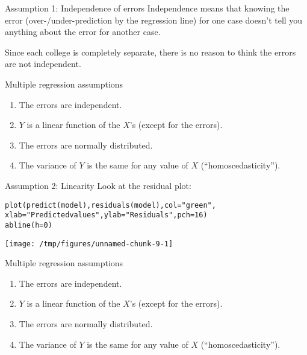 \documentclass{beamer}\usepackage[]{graphicx}\usepackage[]{color}
\makeatletter
\def\maxwidth{ %
  \ifdim\Gin@nat@width>\linewidth
    \linewidth
  \else
    \Gin@nat@width
  \fi
}
\newcommand{\hlnum}[1]{\textcolor[rgb]{0.824,0.412,0.118}{#1}}%
\newcommand{\hlstr}[1]{\textcolor[rgb]{1,0.894,0.71}{#1}}%
\newcommand{\hlstd}[1]{\textcolor[rgb]{1,0.894,0.769}{#1}}%
\newcommand{\hlkwc}[1]{\textcolor[rgb]{0.78,0.941,0.545}{#1}}%
\newcommand{\hlkwd}[1]{\textcolor[rgb]{1,0.78,0.769}{#1}}%
\newenvironment{kframe}{%
 \def\at@end@of@kframe{}%
 \ifinner\ifhmode%
  \def\at@end@of@kframe{\end{minipage}}%
  \begin{minipage}{\columnwidth}%
 \fi\fi%
 \def\FrameCommand##1{\hskip\@totalleftmargin \hskip-\fboxsep
 \colorbox{shadecolor}{##1}\hskip-\fboxsep
     \hskip-\linewidth \hskip-\@totalleftmargin \hskip\columnwidth}%
 \MakeFramed {\advance\hsize-\width
   \@totalleftmargin\z@ \linewidth\hsize
   \@setminipage}}%
 {\par\unskip\endMakeFramed%
 \at@end@of@kframe}
\newenvironment{knitrout}{}{} %
\makeatother
\begin{document}
\begin{darkframes}
    \begin{frame}{Assumption 1: Independence of errors}
      Independence means that knowing the error (over-/under-prediction by the regression line) for one case doesn't tell you anything about the error for another case.

      \bigskip\pause

      Since each college is completely separate, there is no reason to think the errors are not independent.
    \end{frame}

    \begin{frame}{Multiple regression assumptions}
      \begin{enumerate}
        \item The errors are independent. \greencheckmark
        \item $Y$ is a linear function of the $X$'s (except for the errors).
        \item The errors are normally distributed.
        \item The variance of $Y$ is the same for any value of $X$ (``homoscedasticity'').
      \end{enumerate}
    \end{frame}

    \begin{frame}[fragile]{Assumption 2: Linearity}
      Look at the residual plot:

\begin{knitrout}
\color{fgcolor}\begin{kframe}
\begin{alltt}
\hlkwd{plot}\hlstd{(}\hlkwd{predict}\hlstd{(model),} \hlkwd{residuals}\hlstd{(model),} \hlkwc{col}\hlstd{=}\hlstr{"green"}\hlstd{,}
  \hlkwc{xlab}\hlstd{=}\hlstr{"Predicted values"}\hlstd{,} \hlkwc{ylab}\hlstd{=}\hlstr{"Residuals"}\hlstd{,} \hlkwc{pch}\hlstd{=}\hlnum{16}\hlstd{)}
\hlkwd{abline}\hlstd{(}\hlkwc{h}\hlstd{=}\hlnum{0}\hlstd{)}
\end{alltt}
\end{kframe}
\texttt{[image: /tmp/figures/unnamed-chunk-9-1]} 

\end{knitrout}
    \end{frame}

    \begin{frame}{Multiple regression assumptions}
      \begin{enumerate}
        \item The errors are independent. \greencheckmark
        \item $Y$ is a linear function of the $X$'s (except for the errors). \greencheckmark
        \item The errors are normally distributed.
        \item The variance of $Y$ is the same for any value of $X$ (``homoscedasticity'').
      \end{enumerate}
    \end{frame}


\end{darkframes}
\end{document}
